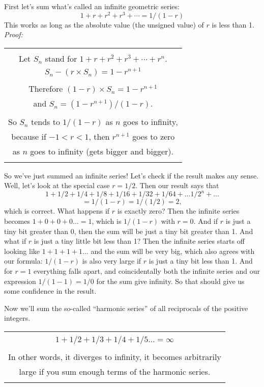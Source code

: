 \documentclass[12pt]{book}
\begin{document}
First let's sum what's called an infinite geometric series:
\[
   1 + r + r^2 + r^3 + \cdots = 1/(1-r)
\]
This works as long as the absolute value (the unsigned value) of $r$ is less than 1.
\emph{Proof:}

\begin{center}
\begin{tabular}{|c|}
\hline
\\
Let $S_n$ stand for $1 + r + r^2 + r^3 + \cdots + r^n.$
\\
$S_n - (r \times S_n) = 1 - r^{n + 1}$
\\
\\
Therefore $(1 - r) \times S_n = 1 - r^{n + 1}$
\\
and $S_n = (1 - r^{n + 1})/(1 - r)$. 
\\
\\
So $S_n$ tends to $1/(1 - r)$ as $n$ goes to infinity,
\\
because if $-1 < r < 1$, then $r^{n + 1}$ goes to zero 
\\
as $n$ goes to infinity (gets bigger and bigger).
\\
\\
\hline
\end{tabular}
\end{center}

So we've just summed an infinite series! Let's check if the result makes any sense.
Well, let's look at the special case $r = 1/2$.  Then our result says that
\[
   1 + 1/2 + 1/4 + 1/8 + 1/16 + 1/32 + 1/64 + \ldots 1/2^n + \ldots 
\]
\[
   = 1/(1-r) = 1/(1/2) = 2,
\]
which is correct. What happens if $r$ is exactly zero? Then the infinite series
becomes $1 + 0 + 0 + 0 \ldots = 1$, which is $1/(1-r)$ with $r = 0$. And if $r$ is just a tiny bit greater
than 0, then the sum will be just a tiny bit greater than 1. And what if $r$ is just a tiny
little bit less than 1? Then the infinite series starts off looking like $1 + 1 + 1 + 1 \ldots$
and the sum will be very big, which also agrees with our formula: $1/(1-r)$ is also very large
if $r$ is just a tiny bit less than 1.  And for $r = 1$ everything falls apart, and coincidentally
both the infinite series and our expression $1/(1-1) = 1/0$ for the sum give infinity.
So that should give us some confidence in the result.

Now we'll sum the so-called ``harmonic series'' of all reciprocals of the positive integers.

\begin{center}
\begin{tabular}{|c|}
\hline
\\
$1 + 1/2 + 1/3 + 1/4 + 1/5 \ldots = \infty$
\\
\\
In other words, it diverges to infinity, 
it becomes arbitrarily 
\\
large
if you sum enough terms of the harmonic series.
\\
\\
\hline
\end{tabular}
\end{center}
\end{document}
